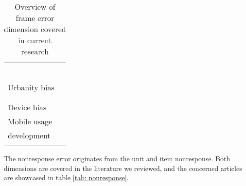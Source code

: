 \begin{table}
\begin{tabular}{ll}
    	& \cite{bosch_measurement_2019}\\
        & \cite{de_bruijne_mobile_2014, zou_mobile_2021}\\
        & \cite{brosnan_pc_2017, antoun_simultaneous_2019}\\
        & \cite{skeie_smartphone_2019, bosch_using_2021}\\
        & \cite{keusch_web_2017, toepoel_what_2014}\\
        & \cite{wenz_willingness_2019}\\
        Urbanity bias & \cite{de_bruijne_mobile_2014}\\
    	& \cite{toepoel_what_2014}\\
        & \cite{keusch_coverage_2020}\\
        Device bias & \cite{keusch_coverage_2020}\\
        Mobile usage & \cite{revilla_online_2016, gummer_does_2019}\\
        development & \cite{de_bruijne_mobile_2014, wells_what_2015}\\
        & \cite{wenz_willingness_2019}\\
        \bottomrule
    \end{tabular}
	\caption{Overview of frame error dimension covered in current research}
	\label{tab: frame}
\end{table}


The nonresponse error originates from the unit and item nonresponse. Both dimensions are covered in the literature we reviewed, and the concerned articles are showcased in table \ref{tab: nonresponse}.

